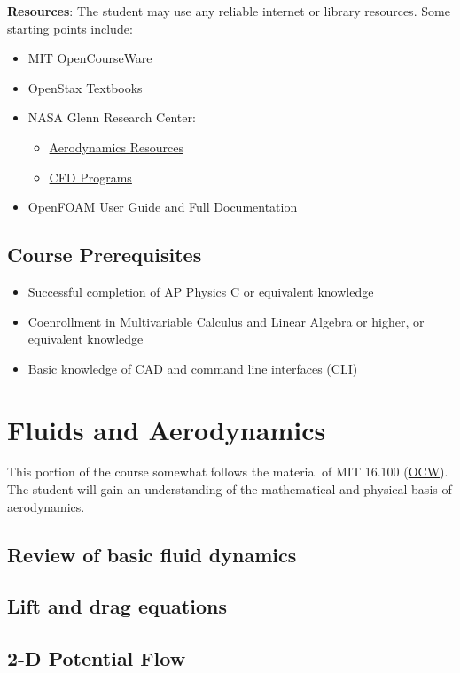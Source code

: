 \documentclass[12pt]{article}
\begin{document}
		\textbf{Resources}: The student may use any reliable internet or library resources. Some starting points include: 
			\begin{itemize}
				\item MIT OpenCourseWare
				\item OpenStax Textbooks
				\item NASA Glenn Research Center: 
				\begin{itemize}
					\item \href{https://www.grc.nasa.gov/www/k-12/airplane/short.html}{Aerodynamics Resources}
					\item \href{https://www.grc.nasa.gov/www/k-12/UndergradProgs/index.htm}{CFD Programs}
				\end{itemize}
				\item OpenFOAM \href{https://cfd.direct/openfoam/user-guide/}{User Guide} and \href{https://cfd.direct/openfoam/documentation/}{Full Documentation}
			\end{itemize}
	\subsection{Course Prerequisites}
		\begin{itemize}
			\item Successful completion of AP Physics C or equivalent knowledge
			\item Coenrollment in Multivariable Calculus and Linear Algebra or higher, or equivalent knowledge
			\item Basic knowledge of CAD and command line interfaces (CLI)
		\end{itemize}
\section{Fluids and Aerodynamics}
This portion of the course somewhat follows the material of MIT 16.100 (\href{https://ocw.mit.edu/courses/aeronautics-and-astronautics/16-100-aerodynamics-fall-2005/index.htm}{OCW}). The student will gain an understanding of the mathematical and physical basis of aerodynamics. 
	\subsection{Review of basic fluid dynamics}
	\subsection{Lift and drag equations}
	\subsection{2-D Potential Flow}
\end{document}
